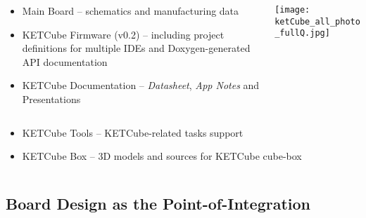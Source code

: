 \begin{frame}%
\centering
      \begin{columns}
      \begin{column}{0.6\paperwidth}
         
         \begin{itemize}
      \item Main Board -- schematics and manufacturing data
      \item KETCube Firmware (v0.2) -- including project definitions for multiple IDEs and Doxygen-generated API documentation
      \item KETCube Documentation -- {\it Datasheet}, {\it App Notes} and Presentations
         \end{itemize}
      \end{column}
      \begin{column}{0.4\paperwidth}
         \centering
         \texttt{[image: ketCube\_all\_photo\_fullQ.jpg]}
         \vfill
       \end{column}
    \end{columns}
  \vspace{-0.5cm}
  \flushleft
  \begin{columns}
      \begin{column}{0.95\paperwidth}
         \begin{itemize}
             \item KETCube Tools -- KETCube-related tasks support
             \item KETCube Box -- 3D models and sources for KETCube cube-box
         \end{itemize}
      \end{column}
      \begin{column}{0.05\paperwidth}
         \centering
         ~
       \end{column}
    \end{columns}
  
\end{frame}


\subsection{Board Design as the Point-of-Integration}

